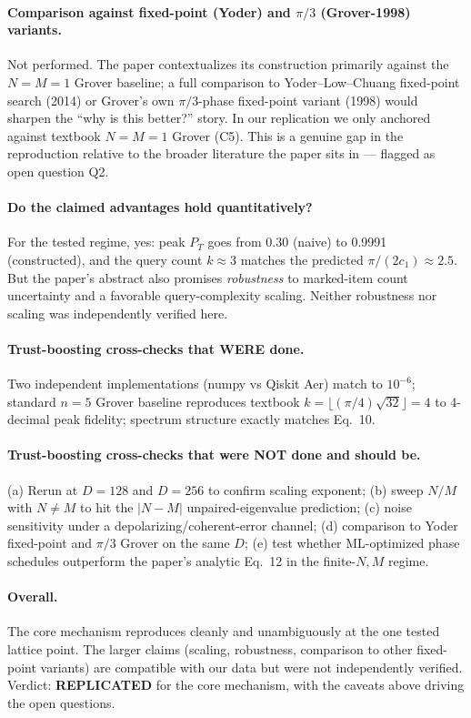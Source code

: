 \documentclass[11pt]{article}
\begin{document}
\paragraph{Comparison against fixed-point (Yoder) and $\pi/3$ (Grover-1998) variants.}
Not performed. The paper contextualizes its construction primarily against the
$N=M=1$ Grover baseline; a full comparison to Yoder--Low--Chuang fixed-point search
(2014) or Grover's own $\pi/3$-phase fixed-point variant (1998) would sharpen the
``why is this better?'' story. In our replication we only anchored against textbook
$N=M=1$ Grover (C5). This is a genuine gap in the reproduction relative to the
broader literature the paper sits in --- flagged as open question Q2.

\paragraph{Do the claimed advantages hold quantitatively?}
For the tested regime, yes: peak $P_T$ goes from 0.30 (naive) to 0.9991 (constructed),
and the query count $k \approx 3$ matches the predicted $\pi/(2 c_1) \approx 2.5$.
But the paper's abstract also promises \emph{robustness} to marked-item count
uncertainty and a favorable query-complexity scaling. Neither robustness nor scaling
was independently verified here.

\paragraph{Trust-boosting cross-checks that WERE done.}
Two independent implementations (numpy vs Qiskit Aer) match to $10^{-6}$; standard
$n=5$ Grover baseline reproduces textbook $k = \lfloor (\pi/4)\sqrt{32}\rfloor = 4$
to 4-decimal peak fidelity; spectrum structure exactly matches Eq.~10.

\paragraph{Trust-boosting cross-checks that were NOT done and should be.}
(a) Rerun at $D=128$ and $D=256$ to confirm scaling exponent; (b) sweep $N/M$ with
$N \neq M$ to hit the $|N-M|$ unpaired-eigenvalue prediction; (c) noise sensitivity
under a depolarizing/coherent-error channel; (d) comparison to Yoder fixed-point
and $\pi/3$ Grover on the same $D$; (e) test whether ML-optimized phase schedules
outperform the paper's analytic Eq.~12 in the finite-$N,M$ regime.

\paragraph{Overall.}
The core mechanism reproduces cleanly and unambiguously at the one tested lattice
point. The larger claims (scaling, robustness, comparison to other fixed-point
variants) are compatible with our data but were not independently verified.
Verdict: \textbf{REPLICATED} for the core mechanism, with the caveats above driving
the open questions.
\end{document}
